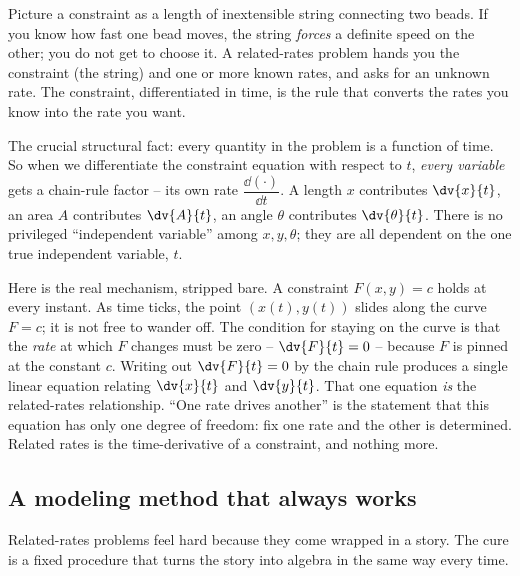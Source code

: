 \begin{intuitionbox}
Picture a constraint as a length of inextensible string connecting two beads. If you know how fast
one bead moves, the string \emph{forces} a definite speed on the other; you do not get to choose it.
A related-rates problem hands you the constraint (the string) and one or more known rates, and asks
for an unknown rate. The constraint, differentiated in time, is the rule that converts the rates you
know into the rate you want.
\end{intuitionbox}

The crucial structural fact: every quantity in the problem is a function of time. So when we
differentiate the constraint equation with respect to $t$, \emph{every variable} gets a chain-rule
factor -- its own rate $\dfrac{\dd(\cdot)}{\dd t}$. A length $x$ contributes $\dv{x}{t}$, an area $A$
contributes $\dv{A}{t}$, an angle $\theta$ contributes $\dv{\theta}{t}$. There is no privileged
``independent variable'' among $x,y,\theta$; they are all dependent on the one true independent
variable, $t$.

\begin{happeningbox}
Here is the real mechanism, stripped bare. A constraint $F(x,y) = c$ holds at every instant. As time
ticks, the point $(x(t), y(t))$ slides along the curve $F=c$; it is not free to wander off. The
condition for staying on the curve is that the \emph{rate} at which $F$ changes must be zero --
$\dv{F}{t} = 0$ -- because $F$ is pinned at the constant $c$. Writing out $\dv{F}{t}=0$ by the chain
rule produces a single linear equation relating $\dv{x}{t}$ and $\dv{y}{t}$. That one equation
\emph{is} the related-rates relationship. ``One rate drives another'' is the statement that this
equation has only one degree of freedom: fix one rate and the other is determined. Related rates is
the time-derivative of a constraint, and nothing more.
\end{happeningbox}

\subsection{A modeling method that always works}

Related-rates problems feel hard because they come wrapped in a story. The cure is a fixed procedure
that turns the story into algebra in the same way every time.

